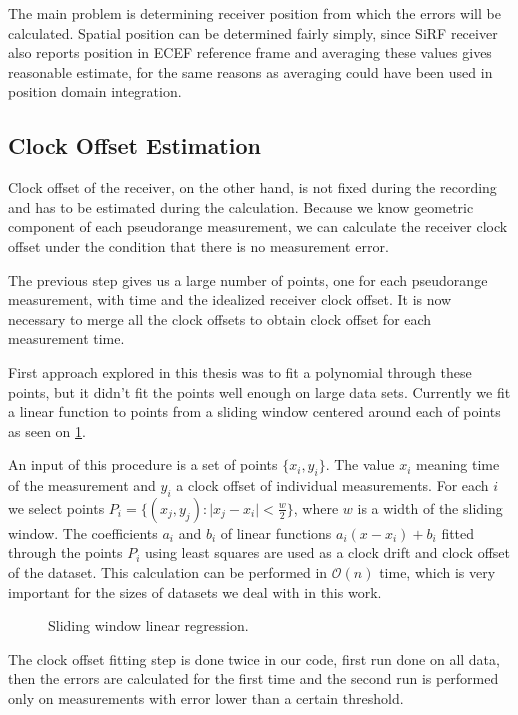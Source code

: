 The main problem is determining receiver position from which the errors will be
calculated.
Spatial position can be determined fairly simply, since SiRF receiver also
reports position in ECEF reference frame and averaging these values gives
reasonable estimate, for the same reasons as averaging could have been used in
position domain integration.

\subsection{Clock Offset Estimation}
\label{sec:impl-clock-offsets}
Clock offset of the receiver, on the other hand, is not fixed during the recording
and has to be estimated during the calculation.
Because we know geometric component of each pseudorange measurement, we can
calculate the receiver clock offset under the condition that there is no measurement
error.

The previous step gives us a large number of points, one for each pseudorange
measurement, with time and the idealized receiver clock offset.
It is now necessary to merge all the clock offsets to obtain clock offset for
each measurement time.

First approach explored in this thesis was to fit a polynomial through these
points, but it didn't fit the points well enough on large data sets.
Currently we fit a linear function to points from a sliding window centered
around each of points as seen on \cref{fig:sliding-window-linear-regression}.

An input of this procedure is a set of points \(\{x_i, y_i\}\).
The value \(x_i\) meaning time of the measurement and 
\(y_i\) a clock offset of individual measurements.
For each \(i\) we select points \(P_i = \{(x_j, y_j) : \lvert{}x_j - x_i\rvert < \frac{w}{2}\}\), where
\(w\) is a width of the sliding window.
The coefficients \(a_i\) and \(b_i\) of linear functions
\(a_i (x - x_i) + b_i\) fitted through the points \(P_i\) using least squares
are used as a clock drift and clock offset of the dataset.
This calculation can be performed in \(\mathcal{O}(n)\) time, which is very
important for the sizes of datasets we deal with in this work.


\begin{figure}[h]
	\centering
	
	\caption{Sliding window linear regression.}
	\label{fig:sliding-window-linear-regression}
\end{figure}

The clock offset fitting step is done twice in our code, first run done on
all data, then the errors are calculated for the first time and the second run
is performed only on measurements with error lower than a certain threshold.

